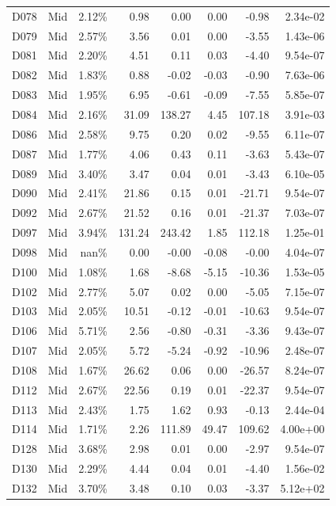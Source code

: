 \begin{tabular}{l l r r r r r r}
D078 & Mid & 2.12\% & 0.98 & 0.00 & 0.00 & -0.98 & 2.34e-02 \\
D079 & Mid & 2.57\% & 3.56 & 0.01 & 0.00 & -3.55 & 1.43e-06 \\
D081 & Mid & 2.20\% & 4.51 & 0.11 & 0.03 & -4.40 & 9.54e-07 \\
D082 & Mid & 1.83\% & 0.88 & -0.02 & -0.03 & -0.90 & 7.63e-06 \\
D083 & Mid & 1.95\% & 6.95 & -0.61 & -0.09 & -7.55 & 5.85e-07 \\
D084 & Mid & 2.16\% & 31.09 & 138.27 & 4.45 & 107.18 & 3.91e-03 \\
D086 & Mid & 2.58\% & 9.75 & 0.20 & 0.02 & -9.55 & 6.11e-07 \\
D087 & Mid & 1.77\% & 4.06 & 0.43 & 0.11 & -3.63 & 5.43e-07 \\
D089 & Mid & 3.40\% & 3.47 & 0.04 & 0.01 & -3.43 & 6.10e-05 \\
D090 & Mid & 2.41\% & 21.86 & 0.15 & 0.01 & -21.71 & 9.54e-07 \\
D092 & Mid & 2.67\% & 21.52 & 0.16 & 0.01 & -21.37 & 7.03e-07 \\
D097 & Mid & 3.94\% & 131.24 & 243.42 & 1.85 & 112.18 & 1.25e-01 \\
D098 & Mid & nan\% & 0.00 & -0.00 & -0.08 & -0.00 & 4.04e-07 \\
D100 & Mid & 1.08\% & 1.68 & -8.68 & -5.15 & -10.36 & 1.53e-05 \\
D102 & Mid & 2.77\% & 5.07 & 0.02 & 0.00 & -5.05 & 7.15e-07 \\
D103 & Mid & 2.05\% & 10.51 & -0.12 & -0.01 & -10.63 & 9.54e-07 \\
D106 & Mid & 5.71\% & 2.56 & -0.80 & -0.31 & -3.36 & 9.43e-07 \\
D107 & Mid & 2.05\% & 5.72 & -5.24 & -0.92 & -10.96 & 2.48e-07 \\
D108 & Mid & 1.67\% & 26.62 & 0.06 & 0.00 & -26.57 & 8.24e-07 \\
D112 & Mid & 2.67\% & 22.56 & 0.19 & 0.01 & -22.37 & 9.54e-07 \\
D113 & Mid & 2.43\% & 1.75 & 1.62 & 0.93 & -0.13 & 2.44e-04 \\
D114 & Mid & 1.71\% & 2.26 & 111.89 & 49.47 & 109.62 & 4.00e+00 \\
D128 & Mid & 3.68\% & 2.98 & 0.01 & 0.00 & -2.97 & 9.54e-07 \\
D130 & Mid & 2.29\% & 4.44 & 0.04 & 0.01 & -4.40 & 1.56e-02 \\
D132 & Mid & 3.70\% & 3.48 & 0.10 & 0.03 & -3.37 & 5.12e+02 \\

\end{tabular}
